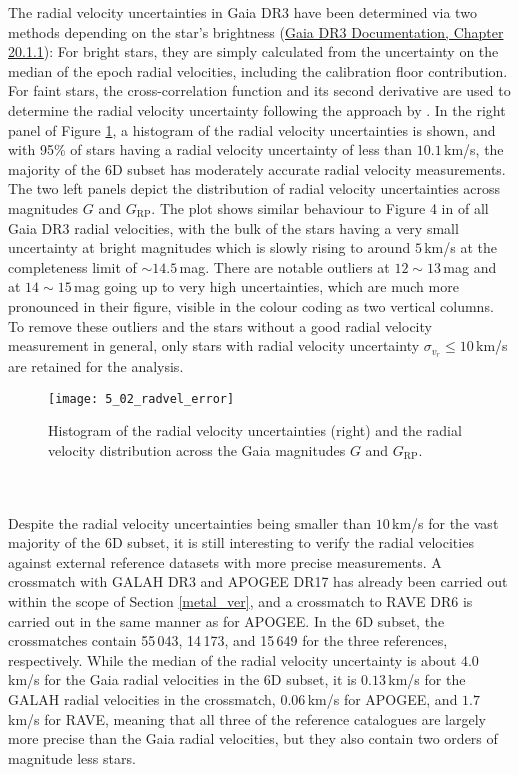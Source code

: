\documentclass[a4paper,11pt]{article}
\begin{document}
The radial velocity uncertainties in Gaia DR3 have been determined via two methods depending on the star's brightness (\href{https://gea.esac.esa.int/archive/documentation/GDR3/Gaia_archive/chap_datamodel/sec_dm_main_source_catalogue/ssec_dm_gaia_source.html}{Gaia DR3 Documentation, Chapter 20.1.1}): For bright stars, they are simply calculated from the uncertainty on the median of the epoch radial velocities, including the calibration floor contribution. For faint stars, the cross-correlation function and its second derivative are used to determine the radial velocity uncertainty following the approach by \citet{zucker03}. In the right panel of Figure \ref{fig:radvel_error}, a histogram of the radial velocity uncertainties is shown, and with 95\% of stars having a radial velocity uncertainty of less than $10.1$\,km/s, the majority of the 6D subset has moderately accurate radial velocity measurements. The two left panels depict the distribution of radial velocity uncertainties across magnitudes $G$ and $G_\mathrm{RP}$. The plot shows similar behaviour to Figure 4 in \citet{babu23} of all Gaia DR3 radial velocities, with the bulk of the stars having a very small uncertainty at bright magnitudes which is slowly rising to around $5$\,km/s at the completeness limit of ${\sim}14.5$\,mag. There are notable outliers at $12{\sim}13$\,mag and at $14{\sim}15$\,mag going up to very high uncertainties, which are much more pronounced in their figure, visible in the colour coding as two vertical columns. To remove these outliers and the stars without a good radial velocity measurement in general, only stars with radial velocity uncertainty $\sigma_{v_r}\leq10$\,km/s are retained for the analysis.
%
\begin{figure}
 \centering
 \texttt{[image: 5\_02\_radvel\_error]}
 \caption[Radial velocity uncertainties]{Histogram of the radial velocity uncertainties (right) and the radial velocity distribution across the Gaia magnitudes $G$ and $G_\mathrm{RP}$.}
 \label{fig:radvel_error}
\end{figure}\\ \\
%
Despite the radial velocity uncertainties being smaller than $10$\,km/s for the vast majority of the 6D subset, it is still interesting to verify the radial velocities against external reference datasets with more precise measurements. A crossmatch with GALAH DR3 and APOGEE DR17 has already been carried out within the scope of Section \ref{metal_ver}, and a crossmatch to RAVE DR6 \citep{ravedr61,ravedr62} is carried out in the same manner as for APOGEE. In the 6D subset, the crossmatches contain 55\,043, 14\,173, and 15\,649 for the three references, respectively. While the median of the radial velocity uncertainty is about $4.0$\,km/s for the Gaia radial velocities in the 6D subset, it is $0.13$\,km/s for the GALAH radial velocities in the crossmatch, $0.06$\,km/s for APOGEE, and $1.7$\,km/s for RAVE, meaning that all three of the reference catalogues are largely more precise than the Gaia radial velocities, but they also contain two orders of magnitude less stars.\\ \\
\end{document}
